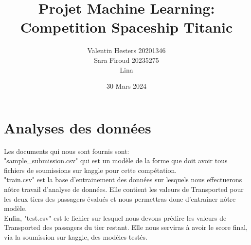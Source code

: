 \documentclass[]{article}
\title{Projet Machine Learning:\\
Competition Spaceship Titanic}
\author{Valentin Hesters 20201346 \\
        Sara Firoud 20235275\\
        Lina}
\date{30 Mars 2024}
\begin{document}
\maketitle
\renewcommand*{\contentsname}{Sommaire}
\tableofcontents
   
    \section{Analyses des données}
    \par
        Les documents qui nous sont fournis sont:\\
        "sample\_submission.csv" qui est un 
        modèle de la forme que doit avoir tous fichiers de soumissions sur kaggle
        pour cette compétation.\\
        "train.csv" est la base d'entrainement des données sur lesquels nous 
        effectuerons nôtre travail d'analyse de données. Elle contient les 
        valeurs de Transported pour les deux tiers des passagers évalués et nous
        permettras donc d'entrainer nôtre modèle.\\
        Enfin, "test.csv" est le fichier sur lesquel nous devons prédire les 
        valeurs de Transported des passagers du tier restant. Elle nous serviras 
        à avoir le score final, via la soumission sur kaggle, des modèles testés.\\
        \par
        
\end{document}
